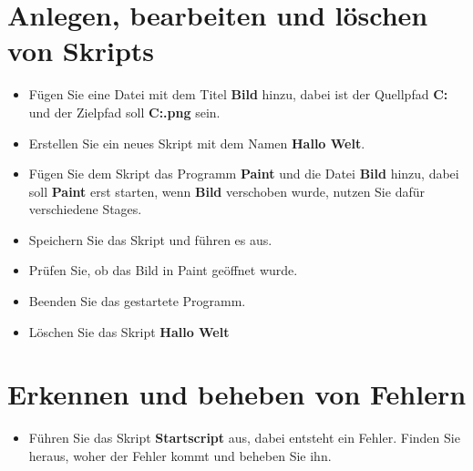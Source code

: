 \documentclass[accentcolor=tud1a,11pt]{tudexercise}
\begin{document}
\nutzerstudie
\section*{Anlegen, bearbeiten und löschen von Skripts}
\begin{itemize}
	\item Fügen Sie eine Datei mit dem Titel \textbf{Bild} hinzu, dabei ist der Quellpfad \textbf{C:\Users\simuser\Desktop\datei} und der Zielpfad soll \textbf{C:\Users\simuser\Desktop\bild.png} sein.
	\item Erstellen Sie ein neues Skript mit dem Namen \textbf{Hallo Welt}.
	\item Fügen Sie dem Skript das Programm \textbf{Paint} und die Datei \textbf{Bild} hinzu, dabei soll \textbf{Paint} erst starten, wenn \textbf{Bild} verschoben wurde, nutzen Sie dafür verschiedene Stages.
	\item Speichern Sie das Skript und führen es aus.
	\item Prüfen Sie, ob das Bild in Paint geöffnet wurde.
	\item Beenden Sie das gestartete Programm.
	\item Löschen Sie das Skript \textbf{Hallo Welt}		
\end{itemize}
\section*{Erkennen und beheben von Fehlern}
\begin{itemize}
	\item Führen Sie das Skript \textbf{Startscript} aus, dabei entsteht ein Fehler. Finden Sie heraus, woher der Fehler kommt und beheben Sie ihn.
\end{itemize}
\end{document}
